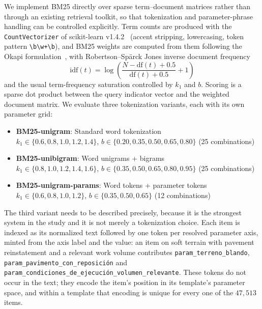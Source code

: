 \documentclass[preprint,review,12pt]{elsarticle}
\begin{document}
We implement BM25 directly over sparse term--document matrices rather than through an existing retrieval toolkit, so that tokenization and parameter-phrase handling can be controlled explicitly. Term counts are produced with the \texttt{CountVectorizer} of scikit-learn v1.4.2~\citep{pedregosa2011scikit} (accent stripping, lowercasing, token pattern \texttt{\textbackslash b\textbackslash w+\textbackslash b}), and BM25 weights are computed from them following the Okapi formulation~\citep{robertson2009probabilistic}, with Robertson--Sp\"arck Jones inverse document frequency
\begin{equation}
\mathrm{idf}(t) = \log\!\left(\frac{N - \mathrm{df}(t) + 0.5}{\mathrm{df}(t) + 0.5} + 1\right)
\end{equation}
and the usual term-frequency saturation controlled by $k_1$ and $b$. Scoring is a sparse dot product between the query indicator vector and the weighted document matrix. We evaluate three tokenization variants, each with its own parameter grid:
\begin{itemize}
    \item \textbf{BM25-unigram}: Standard word tokenization\\
    $k_1 \in \{0.6, 0.8, 1.0, 1.2, 1.4\}$, $b \in \{0.20, 0.35, 0.50, 0.65, 0.80\}$ (25 combinations)
    \item \textbf{BM25-unibigram}: Word unigrams + bigrams\\
    $k_1 \in \{0.8, 1.0, 1.2, 1.4, 1.6\}$, $b \in \{0.35, 0.50, 0.65, 0.80, 0.95\}$ (25 combinations)
    \item \textbf{BM25-unigram-params}: Word tokens + parameter tokens\\
    $k_1 \in \{0.6, 0.8, 1.0, 1.2\}$, $b \in \{0.35, 0.50, 0.65\}$ (12 combinations)
\end{itemize}

The third variant needs to be described precisely, because it is the strongest system in the study and it is not merely a tokenization choice. Each item is indexed as its normalized text followed by one token per resolved parameter axis, minted from the axis label and the value: an item on soft terrain with pavement reinstatement and a relevant work volume contributes \texttt{param\_terreno\_blando}, \texttt{param\_pavimento\_con\_reposici\'on} and \texttt{param\_condiciones\_de\_ejecuci\'on\_volumen\_relevante}. These tokens do not occur in the text; they encode the item's position in its template's parameter space, and within a template that encoding is unique for every one of the $47{,}513$ items.
\end{document}
